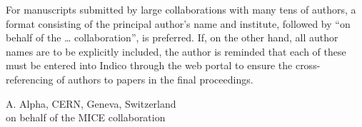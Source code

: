 \documentclass[a4paper,
               ]{jacow}
\begin{document}
\begin{strip}
For manuscripts submitted by large collaborations with many tens of authors, a format consisting of the principal author’s name and institute, followed by “on behalf of the … collaboration”, is preferred. If, on the other hand, all author names are to be explicitly included, the author is reminded that each of these must be entered into Indico through the web portal to ensure the cross-referencing of authors to papers in the final proceedings.
\begin{center}
A. Alpha, CERN, Geneva, Switzerland \\
on behalf of the MICE collaboration
\end{center}

\end{strip}
\end{document}
